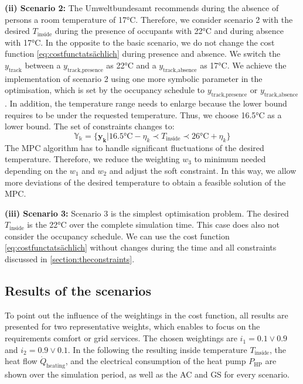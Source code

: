 \textbf{(ii) Scenario 2:}\newline
The Umweltbundesamt \cite{Umweltbundesamt.7.10.2021} recommends during the absence of persons a room temperature of 17°C. Therefore, we consider scenario 2 with the desired $T_\text{inside}$ during the presence of occupants with 22°C and during absence with 17°C. In the opposite to the basic scenario, we do not change the cost function \ref{eq:costfunctatsächlich} during presence and absence. We switch the $y_\text{track}$ between a $y_\text{track,presence}$ as 22°C and a $y_\text{track,absence}$ as 17°C. We achieve the implementation of scenario 2 using one more symbolic parameter in the optimisation, which is set by the occupancy schedule to $y_\text{track,presence}$ or $y_\text{track,absence}$. In addition, the temperature range needs to enlarge because the lower bound requires to be under the requested temperature. Thus, we choose 16.5°C as a lower bound. The set of constraints changes to:
\begin{equation}
    \label{ConstraintYScenario2}
    \mathbb{Y_k} = \{\mathbf{y_k}| 16.5 \text{°C} - \eta_k \prec T_\text{inside} \prec 26 \text{°C}+ \eta_k\} 
\end{equation}
The MPC algorithm has to handle significant fluctuations of the desired temperature. Therefore, we reduce the weighting $w_\text{3}$ to minimum needed depending on the $w_\text{1}$ and $w_\text{2}$ and adjust the soft constraint. In this way, we allow more deviations of the desired temperature to obtain a feasible solution of the MPC. \newline 

\textbf{(iii) Scenario 3:}\newline
Scenario 3 is the simplest optimisation problem. The desired $T_\text{inside}$ is the 22°C over the complete simulation time. This case does also not consider the occupancy schedule. We can use the cost function \ref{eq:costfunctatsächlich} without changes during the time and all constraints discussed in \autoref{section:theconstraints}.

\subsection{Results of the scenarios}
\label{subsec:Results of the scenarios}
To point out the influence of the weightings in the cost function, all results are presented for two representative weights, which enables to focus on the requirements comfort or grid services. The chosen weightings are $i_\text{1} = 0.1 \vee 0.9$ and $i_\text{2} = 0.9 \vee 0.1$. In the following the resulting inside temperature $T_\text{inside}$, the heat flow $\dot{Q}_\text{heating}$, and the electrical consumption of the heat pump $P_\text{HP}$ are shown over the simulation period, as well as the AC and GS for every scenario.\newline

